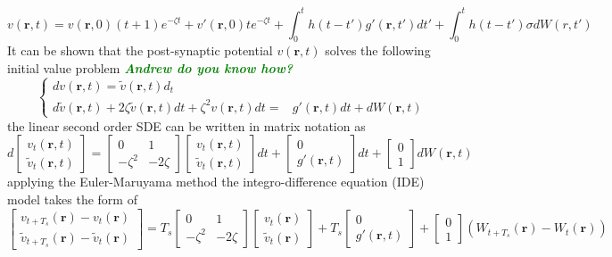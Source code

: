 \documentclass[a4paper,10pt]{article}
\newcommand{\parham}[1]{\textsf{\emph{\textbf{\textcolor{green}{#1}}}}}
\begin{document}
\begin{equation}\label{eq:SecondOrderNeuralModelDeterStoch}
v\left( {\mathbf{r},t} \right)=v(\mathbf r, 0)(t+1)e^{-\zeta t}+v'(\mathbf r,0)te^{-\zeta t}+\int_0^t {h\left( {t - t'} \right)g'\left( {\mathbf{r},t'} \right)dt'}+ \int_0^t h\left( {t - t'} \right)\sigma d W(r,t')
\end{equation}
It can be shown that the post-synaptic potential $v(\mathbf r, t)$ solves the following initial value problem \parham{Andrew do you know how?}
\begin{equation*}\label{eq:SecondOrderInitialValueProblem}
\left\lbrace \begin{array}{lc}
dv(\mathbf r,t)=\tilde{v}(\mathbf r,t)d_t & \\
d\tilde{v}(\mathbf r,t)+2\zeta\tilde{v}(\mathbf r,t)dt+\zeta^2v(\mathbf r,t)dt=&g'(\mathbf r,t)dt+dW(\mathbf r,t)
\end{array}\right.
\end{equation*}
the linear second order SDE can be written in matrix notation as
\begin{equation}\label{eq:SecondOrderSDEMatrix}
 d\begin{bmatrix} v_t(\mathbf r ,t) \\ \tilde{v}_t(\mathbf r ,t)\end{bmatrix}=\begin{bmatrix}0 & 1 \\ -\zeta^2 & -2\zeta \end{bmatrix}\begin{bmatrix} v_t(\mathbf r ,t) \\ \tilde{v}_t(\mathbf r ,t)\end{bmatrix}dt+\begin{bmatrix}0 \\ g'(\mathbf r, t)\end{bmatrix}dt+\begin{bmatrix}0 \\ 1 \end{bmatrix}dW(\mathbf r,t)
\end{equation}
applying the Euler-Maruyama method the integro-difference equation (IDE) model takes the form of
\begin{equation}
 \begin{bmatrix} v_{t+T_s}(\mathbf r)-v_t(\mathbf r) \\ \tilde{v}_{t+T_s}(\mathbf r)-\tilde{v}_t(\mathbf r)\end{bmatrix}=T_s\begin{bmatrix}0 & 1 \\ -\zeta^2 & -2\zeta \end{bmatrix}\begin{bmatrix} v_t(\mathbf r)\\ \tilde{v}_t(\mathbf r)\end{bmatrix}+T_s\begin{bmatrix}0 \\ g'(\mathbf r, t)\end{bmatrix}+\begin{bmatrix}0 \\ 1 \end{bmatrix}(W_{t+T_s}(\mathbf r)-W_t(\mathbf r))
\end{equation}
\end{document}

